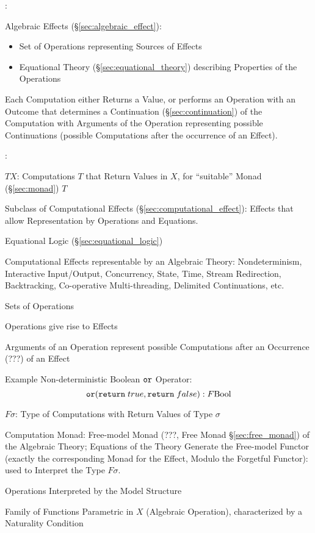 \cite{plotkin-pretnar13}:

Algebraic Effects (\S\ref{sec:algebraic_effect}):
\begin{itemize}
  \item Set of Operations representing Sources of Effects
  \item Equational Theory (\S\ref{sec:equational_theory}) describing
    Properties of the Operations
\end{itemize}

Each Computation either Returns a Value, or performs an Operation with
an Outcome that determines a Continuation (\S\ref{sec:continuation})
of the Computation with Arguments of the Operation representing
possible Continuations (possible Computations after the occurrence of
an Effect).



\cite{plotkin-pretnar09}:

$T X$: Computations $T$ that Return Values in $X$, for ``suitable''
Monad (\S\ref{sec:monad}) $T$

Subclass of Computational Effects (\S\ref{sec:computational_effect}):
Effects that allow Representation by Operations and Equations.

Equational Logic (\S\ref{sec:equational_logic})

Computational Effects representable by an Algebraic Theory:
Nondeterminism, Interactive Input/Output, Concurrency, State, Time,
Stream Redirection, Backtracking, Co-operative Multi-threading,
Delimited Continuations, etc.

Sets of Operations

Operations give rise to Effects

Arguments of an Operation represent possible Computations after an
Occurrence (???) of an Effect

Example Non-deterministic Boolean $\mathtt{or}$ Operator:
\[
  \mathtt{or}(\mathtt{return}\;true, \mathtt{return}\;false)
  : F \mathrm{Bool}
\]

$F \sigma$: Type of Computations with Return Values of Type $\sigma$

Computation Monad: Free-model Monad (???, Free Monad
\S\ref{sec:free_monad}) of the Algebraic Theory; Equations of the
Theory Generate the Free-model Functor (exactly the corresponding
Monad for the Effect, Modulo the Forgetful Functor): used to Interpret
the Type $F \sigma$.

Operations Interpreted by the Model Structure

Family of Functions Parametric in $X$ (Algebraic Operation),
characterized by a Naturality Condition %


